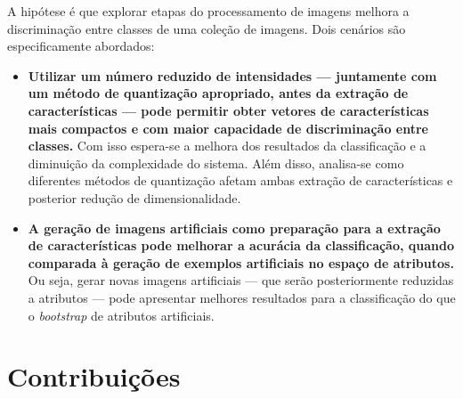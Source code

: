 A hipótese é que explorar etapas do processamento de imagens melhora a discriminação entre classes de uma coleção de imagens. Dois cenários são especificamente abordados:

\begin{itemize}

  \item \textbf{Utilizar um número reduzido de intensidades --- juntamente com um método de quantização apropriado, antes da extração de características --- pode permitir obter vetores de características mais compactos e com maior capacidade de discriminação entre classes.} Com isso espera-se a melhora dos resultados da classificação e a diminuição da complexidade do sistema. Além disso, analisa-se como diferentes métodos de quantização afetam ambas extração de características e posterior redução de dimensionalidade.

  \item \textbf{A geração de imagens artificiais como preparação para a extração de características pode melhorar a acurácia da classificação, quando comparada à geração de exemplos artificiais no espaço de atributos.} Ou seja, gerar novas imagens artificiais — que serão posteriormente reduzidas a atributos — pode apresentar melhores resultados para a classificação do que o \textit{bootstrap} de atributos artificiais.

\end{itemize}

\section{Contribuições}

